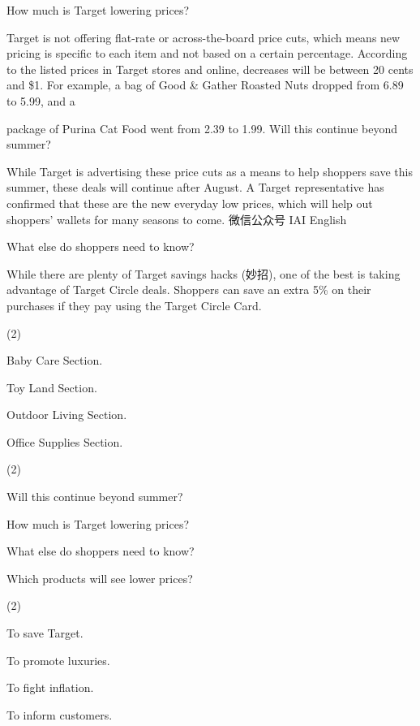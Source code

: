 \documentclass{英语试卷}
\begin{document}
\par How much is Target lowering prices?\par
\par Target is not offering flat-rate or across-the-board price cuts, which means new pricing is specific to each item and not based on a certain percentage. According to the listed prices in Target stores and online, decreases will be between 20 cents and \$1. For example, a bag of Good \& Gather Roasted Nuts dropped from 6.89 to 5.99, and a\par
\par package of Purina Cat Food went from 2.39 to 1.99. Will this continue beyond summer?\par
\par While Target is advertising these price cuts as a means to help shoppers save this summer, these deals will continue after August. A Target representative has confirmed that these are the new everyday low prices, which will help out shoppers' wallets for many seasons to come. 微信公众号 IAI English\par
\par What else do shoppers need to know?\par
\par While there are plenty of Target savings hacks (妙招), one of the best is taking advantage of Target Circle deals. Shoppers can save an extra 5\% on their purchases if they pay using the Target Circle Card.\par
{}
\begin{choices}(2)
  \item Baby Care Section.
  \item Toy Land Section.
  \item Outdoor Living Section.
  \item Office Supplies Section.
\end{choices}
\begin{choices}(2)
  \item Will this continue beyond summer?
  \item How much is Target lowering prices?
  \item What else do shoppers need to know?
  \item Which products will see lower prices?
\end{choices}
\begin{choices}(2)
  \item To save Target.
  \item To promote luxuries.
  \item To fight inflation.
  \item To inform customers.
\end{choices}
\end{document}
